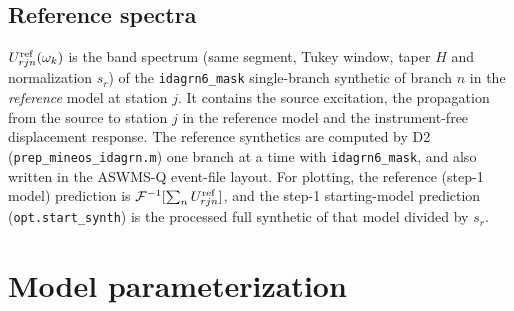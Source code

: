 \documentclass[11pt]{article}
\newcommand{\Ifft}{\mathcal{F}^{-1}}
\begin{document}
\subsection{Reference spectra}
$U^{\rm ref}_{rjn}(\omega_k)$ is the band spectrum (same segment, Tukey
window, taper $H$ and normalization $s_r$) of the \texttt{idagrn6\_mask}
single-branch synthetic of branch $n$ in the \emph{reference} model at
station $j$. It contains the source excitation, the propagation from the
source to station $j$ in the reference model and the instrument-free
displacement response. The reference synthetics are computed by D2
(\texttt{prep\_mineos\_idagrn.m}) one branch at a time with
\texttt{idagrn6\_mask}, and also written in the ASWMS-Q event-file layout.
For plotting, the reference (step-1 model) prediction is
$\Ifft[\sum_n U^{\rm ref}_{rjn}]$, and the step-1 starting-model prediction
(\texttt{opt.start\_synth}) is the processed full synthetic of that model
divided by $s_r$.

\section{Model parameterization}\label{sec:model}
\end{document}
